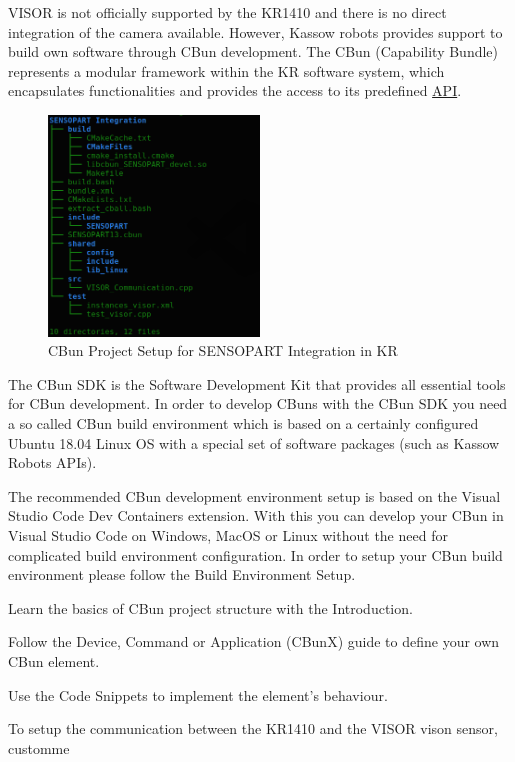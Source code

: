 VISOR is not officially supported by the KR1410 and there is no direct integration of the camera available.
However, Kassow robots provides support to build own software through CBun development.
The CBun (Capability Bundle) represents a modular framework within the KR software system,
which encapsulates functionalities and provides the
access to its predefined \hyperref[acro:API]{API}. \cite{Cbun}


\begin{figure}[h]
    \centering
    \includegraphics[width=0.5\textwidth]{figures/sensopart-development.png}
    \caption{CBun Project Setup for SENSOPART Integration in KR}
    \label{fig:sensopart-development}
\end{figure}

The CBun SDK is the Software Development Kit that provides all essential tools for CBun development. In order to develop CBuns with the CBun SDK you need a so called CBun build environment which is based on a certainly
configured Ubuntu 18.04 Linux OS with a special set of software packages (such as Kassow Robots APIs).

The recommended CBun development environment setup is based on the Visual Studio Code Dev Containers extension. With this you can develop your CBun in Visual Studio Code on Windows, MacOS or Linux without the need for complicated build environment configuration.
In order to setup your CBun build environment please follow the Build Environment Setup.

Learn the basics of CBun project structure with the Introduction.

Follow the Device, Command or Application (CBunX) guide to define your own CBun element.

Use the Code Snippets to implement the element's behaviour.

To setup the communication between the KR1410 and the VISOR vison sensor, customme